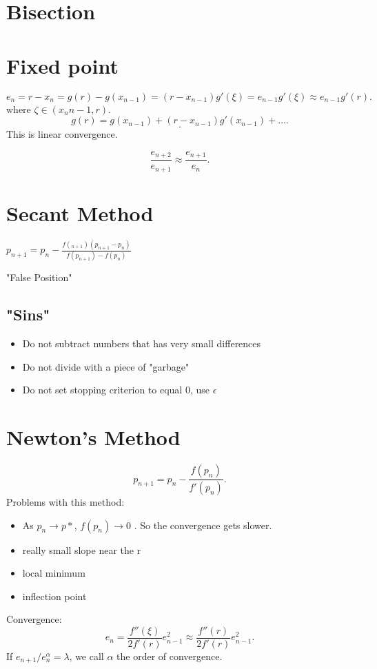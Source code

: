 \documentclass[class=article, crop=false]{standalone}
\theoremstyle{plain}
\theoremstyle{remark}
\begin{document}
	 
\section{Bisection}
\section{Fixed point}
\[
	e_n = r- x_n = g(r) - g(x_{n-1}) = (r-x_{n-1})g'(\xi) = e_{n-1}g'(\xi) \approx e_{n-1}g'(r)
.\] 
where $\zeta \in (x_n{n-1},r)$.
\[
	g(r) = g(x_{n-1}) + (r-x_{n-1})g'(x_{n-1}) + \ldots
.\] 
\[
.\] 
This is linear convergence.

\[
	\frac{e_{n+2}}{e_{n+1}} \approx \frac{e_{n+1}}{e_n}
.\] 

\section{Secant Method}
$p_{n+1} = p_n - \frac{f( _{n+1})( p_{n+1} - p_n)}{f( p_{n+1}) -f( p_n)  }$

"False Position"

\subsection{"Sins"}
\begin{itemize}
	\item Do not subtract numbers that has very small differences
	\item Do not divide with a piece of "garbage"
	\item Do not set stopping criterion to equal 0, use $\epsilon$
\end{itemize}

\section{Newton's Method}
\[
	p_{n+1} = p_n - \frac{f(p_{n})}{f'(p_n)}
.\]
Problems with this method:
\begin{itemize}
	\item As  $p_n \to p*$, $f(p_n) \to 0$ . So the convergence gets slower.
	\item really small slope near the r
	\item local minimum
	\item inflection point
\end{itemize}
Convergence:
\[
	e_n = \frac{f''(\xi)}{2f'(r)}e_{n-1}^2 \approx \frac{f''(r)}{2f'(r)}e_{n-1}^2
.\] 
If $e_{n+1}/e_n^\alpha = \lambda$, we call $\alpha$ the order of convergence.
\end{document}
